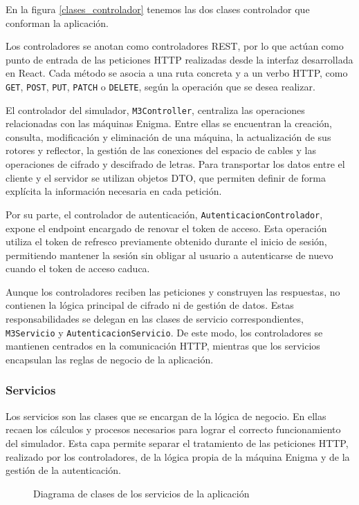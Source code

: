 En la figura \ref{clases_controlador} tenemos las dos clases controlador que conforman la aplicación.

Los controladores se anotan como controladores REST, por lo que actúan como punto de entrada de las peticiones HTTP realizadas desde la interfaz desarrollada en React. Cada método se asocia a una ruta concreta y a un verbo HTTP, como \texttt{GET}, \texttt{POST}, \texttt{PUT}, \texttt{PATCH} o \texttt{DELETE}, según la operación que se desea realizar.

El controlador del simulador, \texttt{M3Controller}, centraliza las operaciones relacionadas con las máquinas Enigma. Entre ellas se encuentran la creación, consulta, modificación y eliminación de una máquina, la actualización de sus rotores y reflector, la gestión de las conexiones del espacio de cables y las operaciones de cifrado y descifrado de letras. Para transportar los datos entre el cliente y el servidor se utilizan objetos DTO, que permiten definir de forma explícita la información necesaria en cada petición.

Por su parte, el controlador de autenticación, \texttt{AutenticacionControlador}, expone el endpoint encargado de renovar el token de acceso. Esta operación utiliza el token de refresco previamente obtenido durante el inicio de sesión, permitiendo mantener la sesión sin obligar al usuario a autenticarse de nuevo cuando el token de acceso caduca.

Aunque los controladores reciben las peticiones y construyen las respuestas, no contienen la lógica principal de cifrado ni de gestión de datos. Estas responsabilidades se delegan en las clases de servicio correspondientes, \texttt{M3Servicio} y \texttt{AutenticacionServicio}. De este modo, los controladores se mantienen centrados en la comunicación HTTP, mientras que los servicios encapsulan las reglas de negocio de la aplicación.

\subsubsection{Servicios}

Los servicios son las clases que se encargan de la lógica de negocio. En ellas recaen los cálculos y procesos necesarios para lograr el correcto funcionamiento del simulador. Esta capa permite separar el tratamiento de las peticiones HTTP, realizado por los controladores, de la lógica propia de la máquina Enigma y de la gestión de la autenticación.

\begin{figure}[htbp]
	\centerline{}
	\caption{Diagrama de clases de los servicios de la aplicación}
	\label{clases_servicio}
\end{figure}

